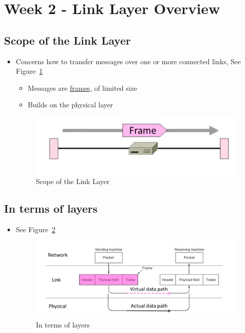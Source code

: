 \documentclass[12pt]{ctexart}   %
\begin{document}
\section{Week 2 - Link Layer Overview}
	\subsection{Scope of the Link Layer}
	\begin{itemize}
		\item Concerns how to transfer messages over one or more connected links, See Figure~\ref{fig:2-6-1}
		\begin{itemize}
			\item Messages are \underline{frames}, of limited size
			\item Builds on the physical layer
		\end{itemize}
		
		\begin{figure}[h!] %
		\centering
		 \includegraphics[scale=0.7]{images/2-6-1}
		\caption{ Scope of the Link Layer}
		 \label{fig:2-6-1}
		 \end{figure}
	\end{itemize}
	
	\subsection{In terms of layers}
	\begin{itemize}
		\item See Figure~\ref{fig:2-6-2}
		\begin{figure}[h!] %
		\centering
		 \includegraphics[scale=0.7]{images/2-6-2}
		\caption{ In terms of layers}
		 \label{fig:2-6-2}
		 \end{figure}
	\end{itemize}
	
\end{document}
